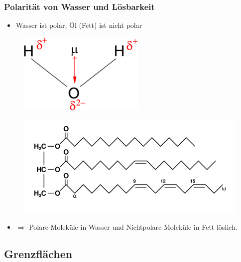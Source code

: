 \documentclass{beamer} %
\begin{document}
\begin{frame}
\frametitle{Polarität von Wasser und Lösbarkeit}
\begin{itemize}
	\item Wasser ist polar, Öl (Fett) ist nicht polar
\end{itemize}
\begin{minipage}[h]{0.49\textwidth}
	\begin{figure}[h]
		\centering
		\includegraphics[width=0.8\linewidth]{water.png}
	\end{figure}
\end{minipage}
\begin{minipage}[h]{0.49\textwidth}
	\begin{figure}[h]
		\centering
		\includegraphics[width=\linewidth]{fett.png}
	\end{figure}
\end{minipage}
\begin{itemize}
	\item $\Rightarrow$ Polare Moleküle in Wasser und Nichtpolare Moleküle in Fett löslich. 
\end{itemize}
\end{frame}

\subsection{Grenzflächen}
\end{document}
